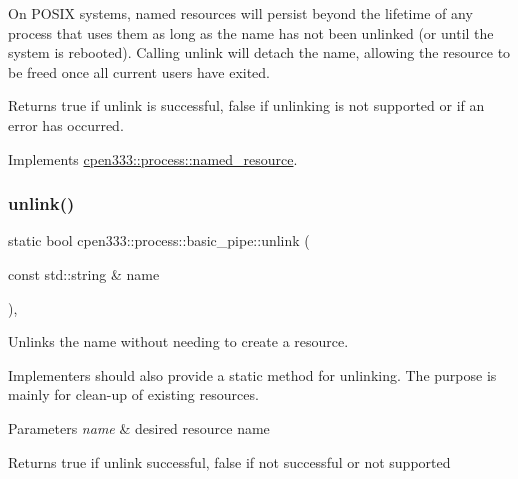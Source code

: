 On P\+O\+S\+IX systems, named resources will persist beyond the lifetime of any process that uses them as long as the name has not been unlinked (or until the system is rebooted). Calling {\ttfamily unlink} will detach the name, allowing the resource to be freed once all current users have exited.

\begin{DoxyReturn}{Returns}
{\ttfamily true} if unlink is successful, {\ttfamily false} if unlinking is not supported or if an error has occurred. 
\end{DoxyReturn}


Implements \hyperlink{classcpen333_1_1process_1_1named__resource_a5d33168fee48c9b0c58ab8fd96e230ce}{cpen333\+::process\+::named\+\_\+resource}.

\mbox{\label{classcpen333_1_1process_1_1basic__pipe_afef75c200701b049e58942210f0d6030}} 
\subsubsection{\texorpdfstring{unlink()}{unlink()}\hspace{0.1cm}{\footnotesize\ttfamily [2/2]}}
{\footnotesize\ttfamily static bool cpen333\+::process\+::basic\+\_\+pipe\+::unlink (\begin{DoxyParamCaption}\item[{const std\+::string \&}]{name }\end{DoxyParamCaption})\hspace{0.3cm}{\ttfamily [inline]}, {\ttfamily [static]}}



Unlinks the name without needing to create a resource. 

Implementers should also provide a static method for unlinking. The purpose is mainly for clean-\/up of existing resources.


\begin{DoxyParams}{Parameters}
{\em name} & desired resource name \\
\hline
\end{DoxyParams}
\begin{DoxyReturn}{Returns}
{\ttfamily true} if unlink successful, {\ttfamily false} if not successful or not supported 
\end{DoxyReturn}
\mbox{\label{classcpen333_1_1process_1_1basic__pipe_a969c7f9d0069b13e8fd3c50d98cb94a5}} 
